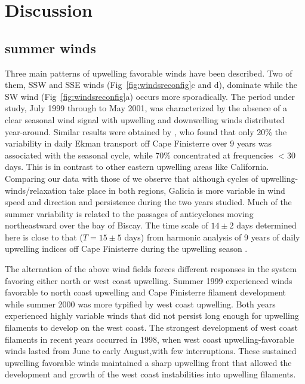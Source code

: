 
\section{Discussion}
\subsection{summer winds}
Three main patterns of upwelling favorable winds have been
described. Two of them, SSW and SSE winds
(Fig~\ref{fig:windsreconfig}c and d), dominate while the SW wind
(Fig~\ref{fig:windsreconfig}a) occurs more sporadically. The
period under study, July 1999 through to May 2001, was
characterized by the absence of a clear seasonal wind signal with
upwelling and downwelling winds distributed year-around. Similar
results were obtained by \nocite{nogueira98}, who found that only 20\% the variability in
daily Ekman transport off Cape Finisterre over 9 years was
associated with the seasonal cycle, while 70\% concentrated at
frequencies $<$30 days. This is in contrast to other eastern
upwelling areas like California. Comparing our data with those of
\nocite{kosro91} we observe
that although cycles of upwelling-winds/relaxation take place in
both regions, Galicia is more variable in wind speed and direction
and persistence during the two years studied. Much of the summer
variability is related to the passages of anticyclones moving
northeastward over the bay of Biscay. The time scale of $14\pm 2$
days determined here is close to that ($T=15\pm 5$ days) from
harmonic analysis of 9 years of daily upwelling indices off Cape
Finisterre during the upwelling season
\nocite{Nogueira97}\markcite{[{\it Nogueira et al., }1997]}.

The alternation of the above wind fields forces different
responses in the system favoring either north or west coast
upwelling. Summer 1999 experienced winds favorable to north coast
upwelling and Cape Finisterre filament development while summer
2000 was more typified by west coast upwelling. Both years
experienced highly variable winds that did not persist long enough
for upwelling filaments to develop on the west coast. The
strongest development of west coast filaments in recent years
occurred in 1998, when west coast upwelling-favorable winds lasted
from June to early August,with few interruptions. These sustained
upwelling favorable winds maintained a sharp upwelling front that
allowed the development and growth of the west coast instabilities
into upwelling filaments.

